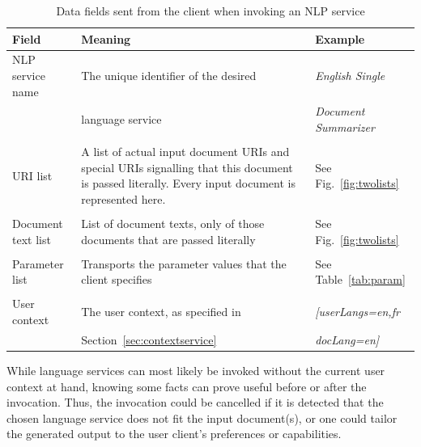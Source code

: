 \begin{table}
 \centering\small\sffamily
 \begin{tabular}{p{}@{\hspace*{4mm}}p{}@{\hspace*{4mm}}p{}}
   \toprule
   \textbf{Field} & \textbf{Meaning} & \textbf{Example} \\
   \midrule
   NLP service name & The unique identifier of the desired & \emph{English Single} \\
    & language service & \emph{Document Summarizer} \\

    & & \\

   URI list & A list of actual input document URIs and special URIs
   signalling that this document is passed literally. Every input
   document is represented here. & See Fig.~\ref{fig:twolists}  \\

    & & \\

   Document text list & List of document texts, only of those
   documents that are passed literally & See Fig.~\ref{fig:twolists}
   \\

    & & \\

   Parameter list & Transports the parameter values that the client
   specifies & See Table~\ref{tab:param} \\

    & & \\

   User context & The user context, as specified in &
   \emph{[userLangs=en,fr} \\
    & Section~\ref{sec:contextservice} & \emph{docLang=en]}\\
 
   \bottomrule
\end{tabular}
 \caption{Data fields sent from the client when invoking an NLP service}
 \label{tab:invocation}
\end{table}

While language services can most likely be invoked without the current
user context at hand, knowing some facts can prove useful before or
after the invocation. Thus, the invocation could be cancelled if it
is detected that the chosen language service does not fit the input
document(s), or one could tailor the generated output to the user
client's preferences or capabilities.


